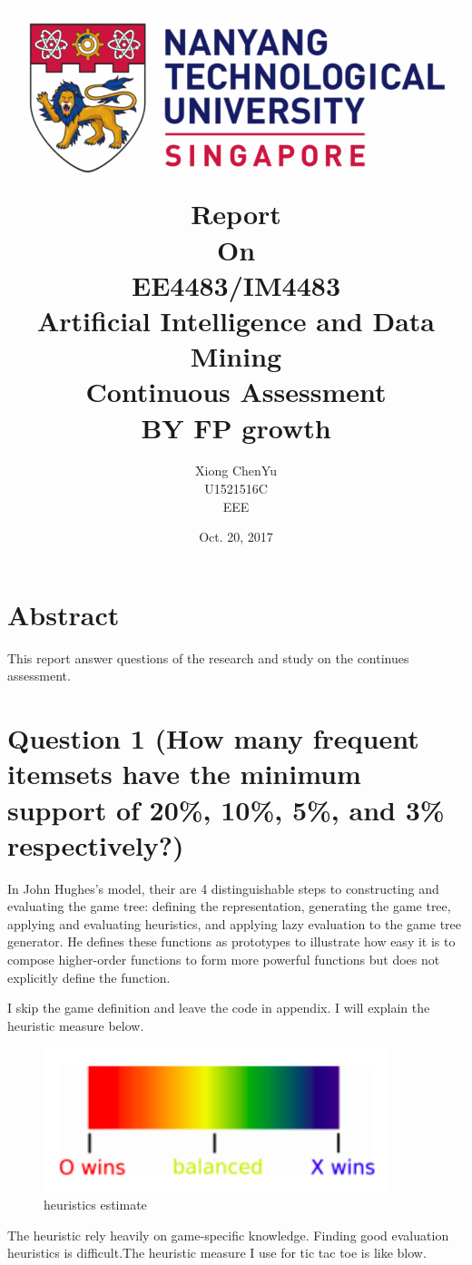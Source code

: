 \documentclass[titlepage]{article}
\author{Xiong ChenYu \\
U1521516C \\
EEE \\
}
\date{Oct. 20, 2017 \\
}
\title{\includegraphics[width=\textwidth]{img/NTU.png} \\
[1\baselineskip] Report \\
On \\
EE4483/IM4483 \\
Artificial Intelligence and Data Mining \\
Continuous Assessment \\
BY FP growth \\
[2\baselineskip]}
\begin{document}
\maketitle
\tableofcontents

\listoftables
\listoffigures

\newpage

\section{Abstract}
\label{sec:org24e01af}
This report answer questions of the research and study on the continues assessment.

\newpage

\section{Question 1 (How many frequent itemsets have the minimum support of 20\%, 10\%, 5\%, and 3\% respectively?)}
\label{sec:org3dfee9b}

In John Hughes’s model, their are 4 distinguishable
steps to constructing and evaluating the game tree: defining
the representation, generating the game tree, applying
and evaluating heuristics, and applying lazy evaluation to
the game tree generator. He defines these functions as prototypes
to illustrate how easy it is to compose higher-order
functions to form more powerful functions but does not explicitly
define the function.

I skip the game definition and leave the code in appendix.  I will explain the heuristic measure below.

\begin{figure}[htbp]
\caption{\label{fig:org0d4b9c5}
heuristics estimate}
\centering
\includegraphics[width=10cm]{./img/color.png}
\end{figure}

  The heuristic rely heavily on game-specific knowledge. Finding good evaluation
heuristics is difficult.The heuristic measure I use for tic tac toe is like blow.
\end{document}
